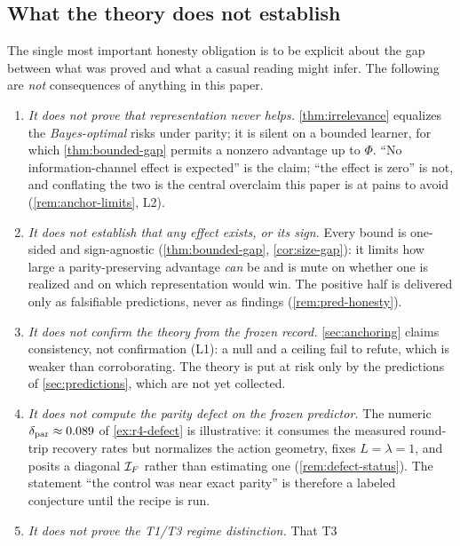 \subsection{What the theory does not establish}
\label{subsec:lim-notestablish}

The single most important honesty obligation is to be explicit about the gap
between what was proved and what a casual reading might infer. The following are
\emph{not} consequences of anything in this paper.

\begin{enumerate}
  \item[(N1)] \emph{It does not prove that representation never helps.}
    \cref{thm:irrelevance} equalizes the \emph{Bayes-optimal} risks under
    parity; it is silent on a bounded learner, for which \cref{thm:bounded-gap}
    permits a nonzero advantage up to $\Phi$. ``No information-channel effect is
    expected'' is the claim; ``the effect is zero'' is not, and conflating the
    two is the central overclaim this paper is at pains to avoid
    (\cref{rem:anchor-limits}, L2).
  \item[(N2)] \emph{It does not establish that any effect exists, or its sign.}
    Every bound is one-sided and sign-agnostic (\cref{thm:bounded-gap},
    \cref{cor:size-gap}): it limits how large a parity-preserving advantage
    \emph{can} be and is mute on whether one is realized and on which
    representation would win. The positive half is delivered only as falsifiable
    predictions, never as findings (\cref{rem:pred-honesty}).
  \item[(N3)] \emph{It does not confirm the theory from the frozen record.}
    \cref{sec:anchoring} claims consistency, not confirmation (L1): a null and a
    ceiling fail to refute, which is weaker than corroborating. The theory is put
    at risk only by the predictions of \cref{sec:predictions}, which are not yet
    collected.
  \item[(N4)] \emph{It does not compute the parity defect on the frozen
    predictor.} The numeric $\delta_{\mathrm{par}}\approx0.089$ of \cref{ex:r4-defect}
    is illustrative: it consumes the measured round-trip recovery rates but normalizes
    the action geometry, fixes $L=\lambda=1$, and posits a diagonal $\mathcal{I}_{F}$
    rather than estimating one (\cref{rem:defect-status}). The statement ``the
    control was near exact parity'' is therefore a labeled conjecture until the
    recipe is run.
  \item[(N5)] \emph{It does not prove the T1/T3 regime distinction.} That T3

\end{enumerate}
